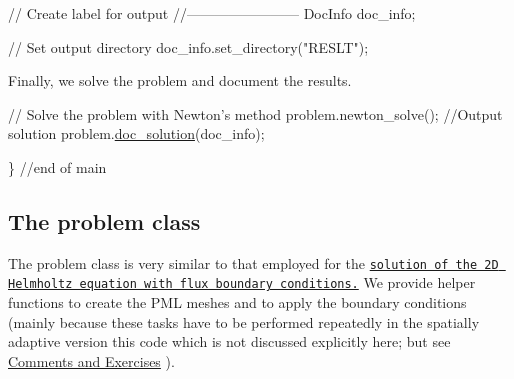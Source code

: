 \begin{DoxyCodeInclude}
 \textcolor{comment}{// Create label for output}
 \textcolor{comment}{//------------------------}
 DocInfo doc\_info;

 \textcolor{comment}{// Set output directory}
 doc\_info.set\_directory(\textcolor{stringliteral}{"RESLT"});

\end{DoxyCodeInclude}


Finally, we solve the problem and document the results.


\begin{DoxyCodeInclude}
 \textcolor{comment}{// Solve the problem with Newton's method}
 problem.newton\_solve();
 \textcolor{comment}{//Output solution}
 problem.\hyperlink{classPMLProblem_ae04985b020a9e0526ab829ca316adb26}{doc\_solution}(doc\_info);

\} \textcolor{comment}{//end of main}

\end{DoxyCodeInclude}
\hypertarget{index_class}{}\subsection{The problem class}\label{index_class}
The problem class is very similar to that employed for the \href{../../../helmholtz/scattering/html/index.html}{\tt solution of the 2D Helmholtz equation with flux boundary conditions.} We provide helper functions to create the P\+ML meshes and to apply the boundary conditions (mainly because these tasks have to be performed repeatedly in the spatially adaptive version this code which is not discussed explicitly here; but see \hyperlink{index_comm_ex}{Comments and Exercises} ).

